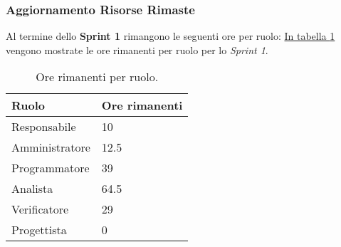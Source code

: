 \subsubsection{Aggiornamento Risorse Rimaste}
\label{sec:AggiornamentoRisorse_Sprint1}
Al termine dello \textbf{Sprint 1} rimangono le seguenti ore per ruolo: \hyperref[tab:sprint1_ore_rimanenti]{In tabella \ref{tab:sprint1_ore_rimanenti}} vengono mostrate le ore rimanenti per ruolo per lo \textit{Sprint 1}.

\begin{table}[H]
    \centering
    \begin{tabular}{| l | l |}
    \hline
    \textbf{Ruolo} & 
    \textbf{Ore rimanenti}\\
    \hline
        Responsabile & 10\\
    \hline
        Amministratore & 12.5\\
    \hline
        Programmatore & 39\\
    \hline
        Analista & 64.5 \\
    \hline
        Verificatore & 29 \\
    \hline
        Progettista & 0 \\
    \hline
    \end{tabular}
    \caption{Ore rimanenti per ruolo.}
    \label{tab:sprint1_ore_rimanenti} 
\end{table}